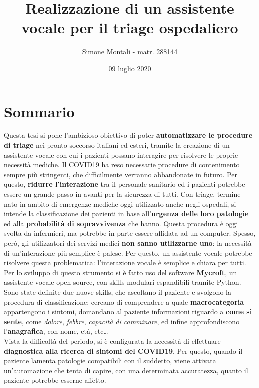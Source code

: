\documentclass[11pt]{article}
\begin{document}
\author{Simone Montali - matr. 288144}
\title{Realizzazione di un assistente vocale per il triage ospedaliero}
\date{09 luglio 2020}
\maketitle

\medskip
\section*{Sommario}
Questa tesi si pone l'ambizioso obiettivo di poter \textbf{automatizzare le procedure di triage} nei pronto soccorso italiani ed esteri, tramite la creazione di un assistente vocale con cui i pazienti possano interagire per risolvere le proprie necessità mediche. Il COVID19 ha reso necessarie procedure di contenimento sempre più stringenti, che difficilmente verranno abbandonate in futuro. Per questo, \textbf{ridurre l'interazione} tra il personale sanitario ed i pazienti potrebbe essere un grande passo in avanti per la sicurezza di tutti. Con triage, termine nato in ambito di emergenze mediche oggi utilizzato anche negli ospedali, si intende la classificazione dei pazienti in base all'\textbf{urgenza delle loro patologie} ed alla \textbf{probabilità di sopravvivenza} che hanno. Questa procedura è oggi svolta da infermieri, ma potrebbe in parte essere affidata ad un computer. Spesso, però, gli utilizzatori dei servizi medici \textbf{non sanno utilizzarne uno}: la necessità di un'interazione più semplice è palese. Per questo, un assistente vocale potrebbe risolvere questa problematica: l'interazione vocale è semplice e chiara per tutti.\\
Per lo sviluppo di questo strumento si è fatto uso del software \textbf{Mycroft}, un assistente vocale open source, con skills modulari espandibili tramite Python. Sono state definite due nuove skills, che ascoltano il paziente e svolgono la procedura di classificazione: cercano di comprendere a quale \textbf{macrocategoria} appartengono i sintomi, domandano al paziente informazioni riguardo a \textbf{come si sente}, come \textit{dolore}, \textit{febbre}, \textit{capacità di camminare}, ed infine approfondiscono l'\textbf{anagrafica}, con nome, età, etc\dots\\
Vista la difficoltà del periodo, si è configurata la necessità di effettuare \textbf{diagnostica alla ricerca di sintomi del COVID19}. Per questo, quando il paziente lamenta patologie compatibili con il suddetto, viene attivata un'automazione che tenta di capire, con una determinata accuratezza, quanto il paziente potrebbe esserne affetto.\\
\end{document}
